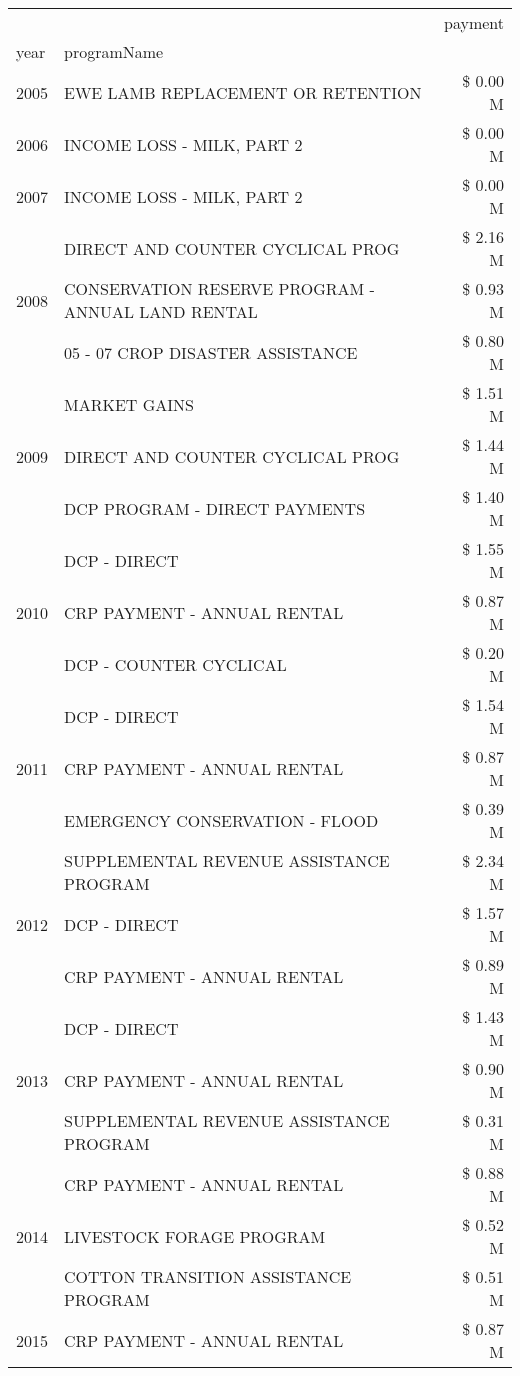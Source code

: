 \begin{tabular}{llr}
\toprule
 &  & payment \\
year & programName &  \\
\midrule
2005 & EWE LAMB REPLACEMENT OR RETENTION & \$ 0.00 M \\
\cline{1-3}
2006 & INCOME LOSS - MILK, PART 2 & \$ 0.00 M \\
\cline{1-3}
2007 & INCOME LOSS - MILK, PART 2 & \$ 0.00 M \\
\cline{1-3}
\multirow[t]{3}{*}{2008} & DIRECT AND COUNTER CYCLICAL PROG & \$ 2.16 M \\
 & CONSERVATION RESERVE PROGRAM - ANNUAL LAND RENTAL & \$ 0.93 M \\
 & 05 - 07 CROP DISASTER ASSISTANCE & \$ 0.80 M \\
\cline{1-3}
\multirow[t]{3}{*}{2009} & MARKET GAINS & \$ 1.51 M \\
 & DIRECT AND COUNTER CYCLICAL PROG & \$ 1.44 M \\
 & DCP PROGRAM - DIRECT PAYMENTS & \$ 1.40 M \\
\cline{1-3}
\multirow[t]{3}{*}{2010} & DCP - DIRECT & \$ 1.55 M \\
 & CRP PAYMENT - ANNUAL RENTAL & \$ 0.87 M \\
 & DCP - COUNTER CYCLICAL & \$ 0.20 M \\
\cline{1-3}
\multirow[t]{3}{*}{2011} & DCP - DIRECT & \$ 1.54 M \\
 & CRP PAYMENT - ANNUAL RENTAL & \$ 0.87 M \\
 & EMERGENCY CONSERVATION - FLOOD & \$ 0.39 M \\
\cline{1-3}
\multirow[t]{3}{*}{2012} & SUPPLEMENTAL REVENUE ASSISTANCE PROGRAM & \$ 2.34 M \\
 & DCP - DIRECT & \$ 1.57 M \\
 & CRP PAYMENT - ANNUAL RENTAL & \$ 0.89 M \\
\cline{1-3}
\multirow[t]{3}{*}{2013} & DCP - DIRECT & \$ 1.43 M \\
 & CRP PAYMENT - ANNUAL RENTAL & \$ 0.90 M \\
 & SUPPLEMENTAL REVENUE ASSISTANCE PROGRAM & \$ 0.31 M \\
\cline{1-3}
\multirow[t]{3}{*}{2014} & CRP PAYMENT - ANNUAL RENTAL & \$ 0.88 M \\
 & LIVESTOCK FORAGE PROGRAM & \$ 0.52 M \\
 & COTTON TRANSITION ASSISTANCE PROGRAM & \$ 0.51 M \\
\cline{1-3}
\multirow[t]{3}{*}{2015} & CRP PAYMENT - ANNUAL RENTAL & \$ 0.87 M \\

\end{tabular}
